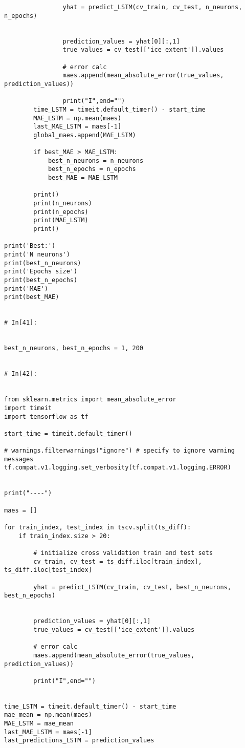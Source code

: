 \begin{verbatim}
                yhat = predict_LSTM(cv_train, cv_test, n_neurons, n_epochs)


                prediction_values = yhat[0][:,1]
                true_values = cv_test[['ice_extent']].values

                # error calc
                maes.append(mean_absolute_error(true_values, prediction_values))

                print("I",end="")
        time_LSTM = timeit.default_timer() - start_time
        MAE_LSTM = np.mean(maes)
        last_MAE_LSTM = maes[-1]
        global_maes.append(MAE_LSTM)

        if best_MAE > MAE_LSTM:
            best_n_neurons = n_neurons
            best_n_epochs = n_epochs
            best_MAE = MAE_LSTM

        print()
        print(n_neurons)
        print(n_epochs)
        print(MAE_LSTM)
        print()    

print('Best:')
print('N neurons')
print(best_n_neurons)
print('Epochs size')
print(best_n_epochs)
print('MAE')
print(best_MAE)


# In[41]:


best_n_neurons, best_n_epochs = 1, 200


# In[42]:


from sklearn.metrics import mean_absolute_error
import timeit
import tensorflow as tf

start_time = timeit.default_timer()

# warnings.filterwarnings("ignore") # specify to ignore warning messages
tf.compat.v1.logging.set_verbosity(tf.compat.v1.logging.ERROR)


print("----")

maes = []

for train_index, test_index in tscv.split(ts_diff):
    if train_index.size > 20:

        # initialize cross validation train and test sets
        cv_train, cv_test = ts_diff.iloc[train_index], ts_diff.iloc[test_index]

        yhat = predict_LSTM(cv_train, cv_test, best_n_neurons, best_n_epochs)


        prediction_values = yhat[0][:,1]
        true_values = cv_test[['ice_extent']].values

        # error calc
        maes.append(mean_absolute_error(true_values, prediction_values))

        print("I",end="")
    

time_LSTM = timeit.default_timer() - start_time
mae_mean = np.mean(maes)
MAE_LSTM = mae_mean
last_MAE_LSTM = maes[-1]
last_predictions_LSTM = prediction_values


\end{verbatim}
